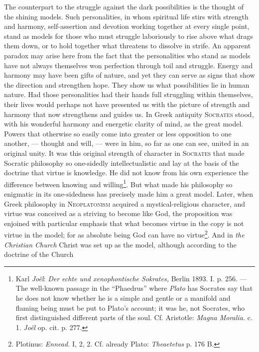 \documentclass[12pt,a4paper,openany]{book}
\newcommand{\opage}[1]{\marginnote{\footnotesize\textit{[#1]}}}
\begin{document}
The counterpart to the struggle against the dark possibilities is the thought of the shining models. Such
personalities, in whom spiritual life stirs with strength and harmony, self-assertion and devotion working
together at every single point, stand as models for those who must struggle laboriously to rise above what
drags them down, or to hold together what threatens to dissolve in strife. An apparent paradox may arise here
from the fact that the personalities who stand as models have not always themselves won perfection through toil
and struggle. Energy and harmony may have been gifts of nature, and yet they can serve as signs that show the
direction and strengthen hope. They show us what possibilities lie in human nature. Had those personalities had
their hands full struggling within themselves, their lives would perhaps not have presented us with the picture
of strength and harmony that now strengthens and guides us. In Greek
\opage{199}antiquity \textsc{Socrates} stood, with his wonderful harmony and energetic clarity of mind, as the great
model. Powers that otherwise so easily come into greater or less opposition to one another, --- thought and will,
--- were in him, so far as one can see, united in an original unity. It was this original strength of character
in \textsc{Socrates} that made Socratic philosophy so one-sidedly intellectualistic and lay at the basis of the
doctrine that virtue is knowledge. He did not know from his own experience the difference between knowing and
willing\footnote[1]{Karl \emph{Joël}: \textit{Der echte und xenophontische Sokrates,} Berlin 1893. I. p. 256.
--- The well-known passage in the ``Phaedrus'' where \emph{Plato} has Socrates say that he does not know whether
he is a simple and gentle or a manifold and flaming being must be put to Plato's account; it was he, not
Socrates, who first distinguished different parts of the soul. Cf. Aristotle: \textit{Magna Moralia.} c. 1.
\emph{Joël} op. cit. p. 277.}. But what made his philosophy so enigmatic in its one-sidedness has precisely made
him a great model. Later, when Greek philosophy in \textsc{Neoplatonism} acquired a mystical-religious character,
and virtue was conceived as a striving to become like God, the proposition was enjoined with particular emphasis
that what becomes virtue in the copy is not virtue in the model; for as absolute being God can have no
virtue\footnote[2]{Plotinus: \textit{Ennead.} I, 2, 2. Cf. already Plato: \textit{Theaetetus} p. 176 B.}. And
in \textit{the Christian Church} Christ was set up as the model, although according to the doctrine of the Church
\end{document}
